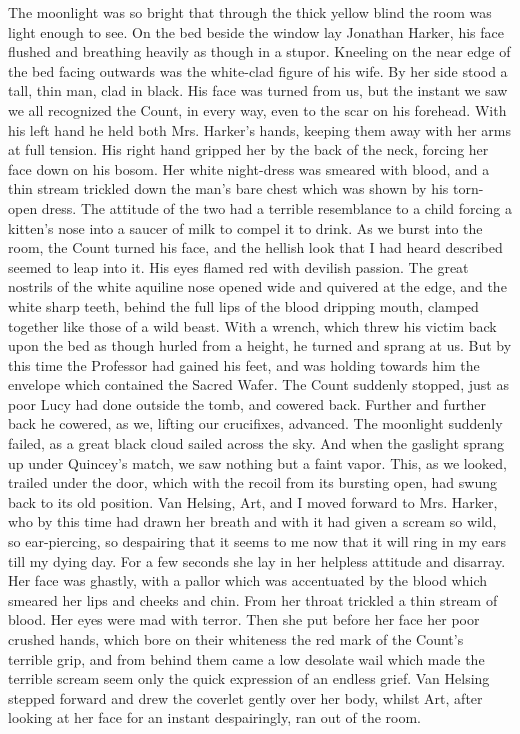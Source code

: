 The moonlight was so bright that through the thick yellow blind the room was light enough to see. On the bed beside the window lay Jonathan Harker, his face flushed and breathing heavily as though in a stupor. Kneeling on the near edge of the bed facing outwards was the white-clad figure of his wife. By her side stood a tall, thin man, clad in black. His face was turned from us, but the instant we saw we all recognized the Count, in every way, even to the scar on his forehead. With his left hand he held both Mrs. Harker's hands, keeping them away with her arms at full tension. His right hand gripped her by the back of the neck, forcing her face down on his bosom. Her white night-dress was smeared with blood, and a thin stream trickled down the man's bare chest which was shown by his torn-open dress. The attitude of the two had a terrible resemblance to a child forcing a kitten's nose into a saucer of milk to compel it to drink. As we burst into the room, the Count turned his face, and the hellish look that I had heard described seemed to leap into it. His eyes flamed red with devilish passion. The great nostrils of the white aquiline nose opened wide and quivered at the edge, and the white sharp teeth, behind the full lips of the blood dripping mouth, clamped together like those of a wild beast. With a wrench, which threw his victim back upon the bed as though hurled from a height, he turned and sprang at us. But by this time the Professor had gained his feet, and was holding towards him the envelope which contained the Sacred Wafer. The Count suddenly stopped, just as poor Lucy had done outside the tomb, and cowered back. Further and further back he cowered, as we, lifting our crucifixes, advanced. The moonlight suddenly failed, as a great black cloud sailed across the sky. And when the gaslight sprang up under Quincey's match, we saw nothing but a faint vapor. This, as we looked, trailed under the door, which with the recoil from its bursting open, had swung back to its old position. Van Helsing, Art, and I moved forward to Mrs. Harker, who by this time had drawn her breath and with it had given a scream so wild, so ear-piercing, so despairing that it seems to me now that it will ring in my ears till my dying day. For a few seconds she lay in her helpless attitude and disarray. Her face was ghastly, with a pallor which was accentuated by the blood which smeared her lips and cheeks and chin. From her throat trickled a thin stream of blood. Her eyes were mad with terror. Then she put before her face her poor crushed hands, which bore on their whiteness the red mark of the Count's terrible grip, and from behind them came a low desolate wail which made the terrible scream seem only the quick expression of an endless grief. Van Helsing stepped forward and drew the coverlet gently over her body, whilst Art, after looking at her face for an instant despairingly, ran out of the room. 

